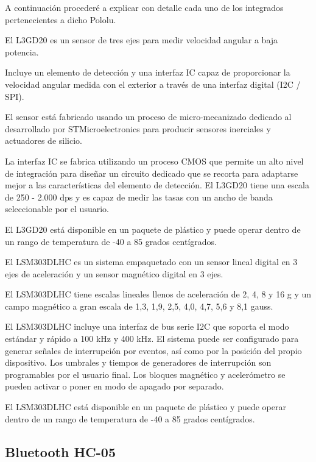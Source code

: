 			A continuaci\'on proceder\'e a explicar con detalle cada uno de los integrados pertenecientes a dicho Pololu.
			
			El L3GD20 es un sensor de tres ejes para medir velocidad angular a baja potencia.
			
			Incluye un elemento de detecci\'on y una interfaz IC capaz de proporcionar la velocidad angular medida con el exterior a trav\'es de una interfaz digital (I2C / SPI).
			
			El sensor est\'a fabricado usando un proceso de micro-mecanizado dedicado al desarrollado por STMicroelectronics para producir sensores inerciales y actuadores de silicio.
			
			La interfaz IC se fabrica utilizando un proceso CMOS que permite un alto nivel de integraci\'on para dise\~nar un circuito dedicado que se recorta para adaptarse mejor a las caracter\'isticas del elemento de detecci\'on. El L3GD20 tiene una escala de 250 - 2.000 dps y es capaz de medir las tasas con un ancho de banda seleccionable por el usuario.
			
			El L3GD20 est\'a disponible en un paquete de pl\'astico y puede operar dentro de un rango de temperatura de -40 a 85 grados cent\'igrados.
			
			El LSM303DLHC es un sistema empaquetado con un sensor lineal digital en 3 ejes de aceleraci\'on y un sensor magn\'etico digital en 3 ejes.
			
			El LSM303DLHC tiene escalas lineales llenos de aceleración de 2, 4, 8 y 16 g y un campo magn\'etico a gran escala de 1,3, 1,9, 2,5, 4,0, 4,7, 5,6 y 8,1 gauss.
			
			El LSM303DLHC incluye una interfaz de bus serie I2C que soporta el modo est\'andar y r\'apido a 100 kHz y 400 kHz. El sistema puede ser configurado para generar se\~nales de interrupci\'on por eventos, as\'i como por la posici\'on del propio dispositivo. Los umbrales y tiempos de generadores de interrupci\'on son programables por el usuario final. Los bloques magn\'etico y aceler\'ometro se pueden activar o poner en modo de apagado por separado.

			El LSM303DLHC est\'a disponible en un paquete de pl\'astico y puede operar dentro de un rango de temperatura de -40 a 85 grados cent\'igrados.
			
			
			
		\subsection{Bluetooth HC-05}
		
